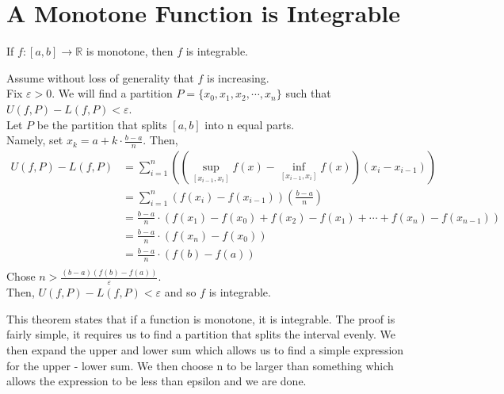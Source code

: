 \documentclass[12pt]{article}
\begin{document}
\section{A Monotone Function is Integrable}
\begin{theo}{}
If \(f:[a, b] \to \mathbb R\) is monotone, then \(f\) is integrable.    
\end{theo}
\begin{prf}{}
Assume without loss of generality that \(f\) is increasing.\\
Fix \(\varepsilon > 0\). We will find a partition \(P = \{x_0, x_1, x_2, \cdots, x_n\}\) such that \(U(f, P) - L(f, P) < \varepsilon\).\\
Let \(P\) be the partition that splits \([a, b]\) into n equal parts.\\
Namely, set \(x_k = a+ k\cdot \frac{b-a}{n}\). Then,
\begin{align*}
    U(f, P) - L(f, P) &= \displaystyle\sum_{i=1}^n\left(\left(\displaystyle\sup_{[x_{i-1}, x_i]}f(x) - \displaystyle\inf_{[x_{i-1}, x_i]}f(x)\right)\left(x_{i} - x_{i-1}\right)\right)\\
    &= \displaystyle\sum_{i=1}^n\left(f(x_i)-f(x_{i-1})\right)\left(\frac{b - a}{n}\right)\\
    &= \frac{b - a}{n}\cdot \left(f(x_1) - f(x_0) + f(x_2) - f(x_1) + \cdots + f(x_n) - f(x_{n-1})\right)\\
    &= \frac{b - a}{n}\cdot \left(f(x_n) - f(x_0)\right)\\
    &= \frac{b - a}{n}\cdot \left(f(b) - f(a)\right)\\
\end{align*}    
Chose \(n > \frac{(b - a)(f(b) - f(a))}{\varepsilon}\).\\
Then, \(U(f, P) - L(f, P) < \varepsilon\) and so \(f\) is integrable.
\end{prf}
\begin{explanation}{}
    This theorem states that if a function is monotone, it is integrable. The proof is fairly simple, it requires us to find a partition that splits the interval evenly. We then expand the upper and lower sum which allows us to find a simple expression for the upper - lower sum. We then choose n to be larger than something which allows the expression to be less than epsilon and we are done.\\
\end{explanation}
\end{document}
